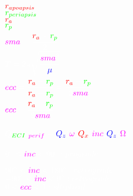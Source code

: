 \documentclass{article}
\begin{document}
$\color{red}r_{apoapsis}$\\

$\color{green}r_{periapsis}$\\

$\color{red}r_{a}$\\

$\color{green}r_{p}$\\

$
\color{mag}sma\color{white}=
\cfrac{\color{red}r_a\color{white}+\color{green}r_p\color{white}}{2}
$\\

$
\color{white}T=2\pi\sqrt{\cfrac{\color{mag}sma\color{white}^3}{\color{blue}\mu}\color{white}}
$\\

$
\color{mag}ecc\color{white}=
\cfrac{\color{red}r_a\color{white}-\color{green}r_p\color{white}}{\color{red}r_a\color{white}+\color{green}r_p\color{white}}=
\cfrac{\color{red}r_a\color{white}-\color{green}r_p\color{white}}{\color{white}2\color{mag}sma\color{white}}
$\\

$
\color{mag}ecc\color{white}=
\cfrac{\color{red}r_a\color{white}-\color{green}r_p\color{white}}{\color{white}2\color{mag}sma\color{white}}
$\\\\



$
\color{white}Q_{\color{green}ECI\color{white}2\color{mag}perif}\color{white}=
\color{blue}Q_z\color{white}(\color{mag}\omega\color{white})
\color{red}Q_x\color{white}(\color{mag}inc\color{white})
\color{blue}Q_z\color{white}(\color{mag}\Omega\color{white})
$\\\\



$
\color{white}0^{\circ}\leq\color{mag}inc\color{white}<90^{\circ}: prograde
$

$
\color{white}90^{\circ}<\color{mag}inc\color{white}<180^{\circ}: retrograde
$\\		

$
\color{white}-90^{\circ}<\color{mag}inc\color{white}<0^{\circ}: retrograde
$\\	


$\color{white}0<\color{mag}ecc\color{white}<1: elliptical$
\end{document}
